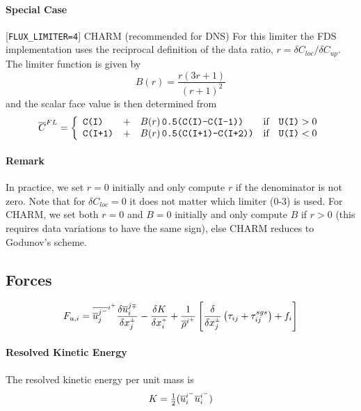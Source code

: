 \documentclass[11pt]{article}
\begin{document}
\paragraph{Special Case} [{\tt FLUX\_LIMITER=4}] CHARM (recommended for DNS) For this limiter the FDS implementation uses the reciprocal definition of the data ratio, $r = \delta C_{loc}/\delta C_{up}$.  The limiter function is given by \cite{Zhou,Kempf}
\begin{equation}
B(r) = \frac{r(3r+1)}{(r+1)^2}
\end{equation}
and the scalar face value is then determined from
\begin{equation}
\label{eqn_charm_limiter}
\overline{C}^{\tiny FL} = \left\{ \begin{array}{lcll} \mbox{\tt C(I)} &+& B(r) \,\mbox{\tt 0.5(C(I)-C(I-1))} & \mbox{if} \quad \mbox{\tt U(I)}>0 \\
\mbox{\tt C(I+1)} &+& B(r) \,\mbox{\tt 0.5(C(I+1)-C(I+2))} & \mbox{if} \quad \mbox{\tt U(I)}<0 \end{array} \right.
\end{equation}

\paragraph{Remark} In practice, we set $r=0$ initially and only compute $r$ if the denominator is not zero.  Note that for $\delta C_{loc}=0$ it does not matter which limiter (0-3) is used.  For CHARM, we set both $r=0$ and $B=0$ initially and only compute $B$ if $r>0$ (this requires data variations to have the same sign), else CHARM reduces to Godunov's scheme.

\subsection{Forces}

\begin{equation}
\label{eqn_force}
F_{u,i} = \overline{\overline{u}_j^{j^-}}^{i^+} \frac{\delta \overline{u}_i^{j{\scriptscriptstyle \mp}}}{\delta x_j^{\scriptscriptstyle \pm}} - \frac{\delta K}{\delta x_i^{\scriptscriptstyle +}} + \frac{1}{\overline{\rho}^{i^+}} \left[ \frac{\delta}{\delta x_j^{\scriptscriptstyle \pm}} \left( \tau_{ij} + \tau_{ij}^{sgs} \right) + f_i \right]
\end{equation}

\paragraph{Resolved Kinetic Energy} The resolved kinetic energy per unit mass is
\begin{equation}
\label{eqn_ke}
K = \mbox{$\frac{1}{2}$} ( \overline{u}_i^{i^-}\overline{u}_i^{i^-} )
\end{equation}
\end{document}
